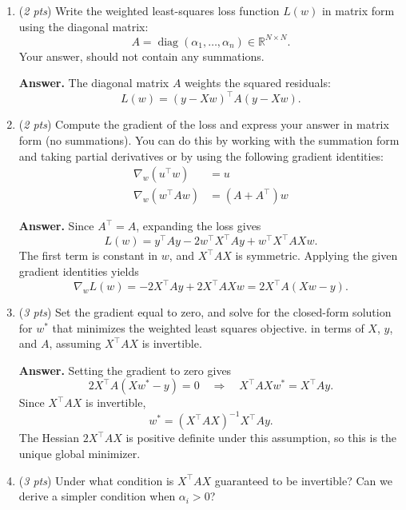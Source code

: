 \documentclass[11pt]{article}
\begin{document}
    \begin{enumerate}[label=(\alph*)]
        \item (\textit{2 pts}) Write the weighted least-squares loss function $L(w)$ in matrix form using the diagonal matrix: 
        \[
        A = \operatorname{diag}(\alpha_1,\dots,\alpha_n)\in\mathbb{R}^{N\times N}.
        \]
        Your answer, should not contain any summations.

        \textbf{Answer.} The diagonal matrix $A$ weights the squared residuals:
        \[
            \boxed{L(w)=(y-Xw)^\top A(y-Xw).}
        \]

        \item (\textit{2 pts}) Compute the gradient of the loss and express your answer in matrix form (no summations). You can do this by working with the summation form and taking partial derivatives or by using the following gradient identities:
        \begin{align*}
            \nabla_w \left(u^\top w\right) &= u \\
            \nabla_w \left( w^\top A w  \right)&= (A + A^\top) w  
        \end{align*}

        \textbf{Answer.} Since $A^\top=A$, expanding the loss gives
        \[
            L(w)=y^\top Ay-2w^\top X^\top Ay+w^\top X^\top AXw.
        \]
        The first term is constant in $w$, and $X^\top AX$ is symmetric.
        Applying the given gradient identities yields
        \[
            \boxed{\nabla_w L(w)=-2X^\top Ay+2X^\top AXw
            =2X^\top A(Xw-y).}
        \]
        
        \item (\textit{3 pts}) Set the gradient equal to zero, and solve for the closed-form solution for $w^\ast$ that minimizes the weighted least squares objective. 
        in terms of $X$, $y$, and $A$, assuming $X^\top A X$ is invertible.

        \textbf{Answer.} Setting the gradient to zero gives
        \[
            2X^\top A(Xw^\ast-y)=0
            \quad\Longrightarrow\quad X^\top AXw^\ast=X^\top Ay.
        \]
        Since $X^\top AX$ is invertible,
        \[
            \boxed{w^\ast=(X^\top AX)^{-1}X^\top Ay.}
        \]
        The Hessian $2X^\top AX$ is positive definite under this assumption,
        so this is the unique global minimizer.

        \item (\textit{3 pts}) Under what condition is $X^\top A X$ guaranteed to be invertible? Can we derive a simpler condition when $\alpha_i > 0$?


\end{enumerate}
\end{document}
